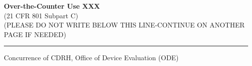 \vfill

\noindent \textbf{Over-the-Counter Use XXX} \\
(21 CFR 801 Subpart C)\\[1em]

\noindent (PLEASE DO NOT WRITE BELOW THIS LINE-CONTINUE ON ANOTHER PAGE IF
NEEDED)

\rule{\linewidth}{0.5mm}
\begin{center}
  Concurrence of CDRH, Office of Device Evaluation (ODE)
\end{center}

\vspace{5em}


